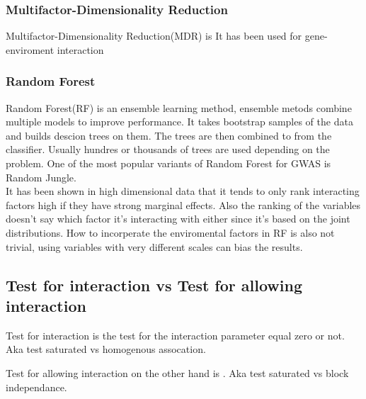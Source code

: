 \documentclass[10pt,a4paper]{article}
\begin{document}
\subsubsection{Multifactor-Dimensionality Reduction}
Multifactor-Dimensionality Reduction(MDR) is \cite{mdr_2001}
It has been used for gene-enviroment interaction\cite{gene_enviroment_2013}

\subsubsection{Random Forest}
Random Forest(RF) is an ensemble learning method, ensemble metods combine multiple models to improve performance. It takes bootstrap samples of the data and builds descion trees on them. The trees are then combined to from the classifier. Usually hundres or thousands of trees are used depending on the problem\cite{random_forest}. One of the most popular variants of Random Forest for GWAS is Random Jungle.\cite{random_jungle}
\\
It has been shown in high dimensional data that it tends to only rank interacting factors high if they have strong marginal effects\cite{winham_rf_2012}. Also the ranking of the variables doesn't say which factor it's interacting with either since it's based on the joint distributions\cite{gene_enviroment_2013}. How to incorperate the enviromental factors in RF is also not trivial, using variables with very different scales can bias the results\cite{gene_enviroment_2013}.


\subsection{Test for interaction vs Test for allowing interaction}
\label{test_type}
Test for interaction is the test for the interaction parameter equal zero or not. Aka test saturated vs homogenous assocation\cite{boost_gene_gene}.

Test for allowing interaction on the other hand is . Aka test saturated vs block independance\cite{boost_gene_gene}.
\end{document}
